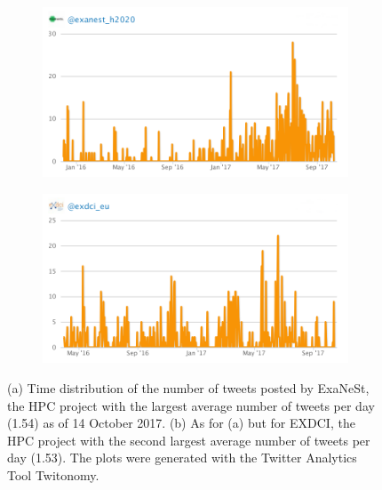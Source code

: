 \begin{figure}
 \centering
 \begin{subfigure}[t]{0.9\textwidth}
   \includegraphics[width=1\linewidth]{Images/Tweets_Exanest.png}
   \caption{} 
 \end{subfigure}

 \begin{subfigure}[t]{0.9\textwidth}
   \includegraphics[width=1\linewidth]{Images/Tweets_Exdci.png}
   \caption{}
 \end{subfigure}
 \caption{(a) Time distribution of the number of tweets posted by ExaNeSt, the HPC project with the largest average number of tweets per day (1.54) as of 14 October 2017. (b) As for (a) but for EXDCI, the HPC project with the second largest average number of tweets per day (1.53). The plots were generated with the Twitter Analytics Tool Twitonomy.} 
 \label{Tweets_Exanest-Exdci}
\end{figure}

